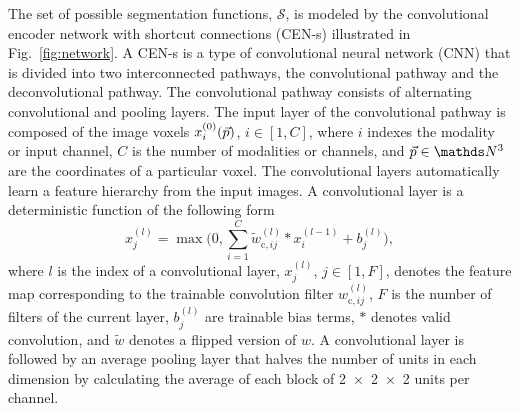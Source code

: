 The set of possible segmentation functions, $\mathcal{S}$, is modeled by the
convolutional encoder network with shortcut connections (CEN-s) illustrated in
Fig.~\ref{fig:network}. A CEN-s is a type of convolutional neural network (CNN)
\cite{LeCun1998} that is divided into two interconnected pathways, the
convolutional pathway and the deconvolutional \cite{zeiler2011} pathway. The
convolutional pathway consists of alternating convolutional and pooling layers.
The input layer of the convolutional pathway is composed of the image voxels
$x^{(0)}_i(\vec{p})$, $i \in [1, C]$, where $i$ indexes the modality or input
channel, $C$ is the number of modalities or channels, and $\vect{p} \in \N^3$
are the coordinates of a particular voxel. The convolutional layers
automatically learn a feature hierarchy from the input images. A convolutional
layer is a deterministic function of the following form
\begin{equation}
x^{(l)}_j = \max \Bigg(0, \sum_{i=1}^C\tilde{w}^{(l)}_{\text{c},ij}*x^{(l-1)}_i
+ b^{(l)}_j\Bigg),
\end{equation}
where $l$ is the index of a convolutional layer, $x^{(l)}_j$, $j \in [1,F]$,
denotes the feature map corresponding to the trainable convolution filter
$w^{(l)}_{\text{c},ij}$, $F$ is the number of filters of the current layer,
$b^{(l)}_j$ are trainable bias terms, $*$ denotes valid convolution, and
$\tilde{w}$ denotes a flipped version of $w$. A convolutional layer is followed
by an average pooling layer \cite{scherer2010evaluation} that halves the number
of units in each dimension by calculating the average of each block of
\num{2x2x2} units per channel.


